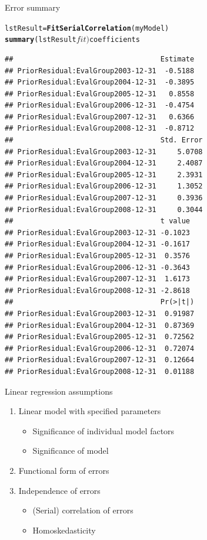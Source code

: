 \documentclass[xcolor=dvipsnames]{beamer}\usepackage{graphicx, color}
\makeatletter
\newcommand{\hlfunctioncall}[1]{\textcolor[rgb]{0.501960784313725,0,0.329411764705882}{\textbf{#1}}}%
\newenvironment{kframe}{%
 \def\at@end@of@kframe{}%
 \ifinner\ifhmode%
  \def\at@end@of@kframe{\end{minipage}}%
  \begin{minipage}{\columnwidth}%
 \fi\fi%
 \def\FrameCommand##1{\hskip\@totalleftmargin \hskip-\fboxsep
 \colorbox{shadecolor}{##1}\hskip-\fboxsep
     \hskip-\linewidth \hskip-\@totalleftmargin \hskip\columnwidth}%
 \MakeFramed {\advance\hsize-\width
   \@totalleftmargin\z@ \linewidth\hsize
   \@setminipage}}%
 {\par\unskip\endMakeFramed%
 \at@end@of@kframe}
\newenvironment{knitrout}{}{} %
\makeatother
\begin{document}
\begin{frame}[fragile]{Error summary}
\begin{knitrout}\tiny
{}\color{fgcolor}\begin{kframe}
\begin{alltt}
lstResult = \hlfunctioncall{FitSerialCorrelation}(myModel)
\hlfunctioncall{summary}(lstResult$fit)$coefficients
\end{alltt}
\begin{verbatim}
##                                   Estimate
## PriorResidual:EvalGroup2003-12-31  -0.5188
## PriorResidual:EvalGroup2004-12-31  -0.3895
## PriorResidual:EvalGroup2005-12-31   0.8558
## PriorResidual:EvalGroup2006-12-31  -0.4754
## PriorResidual:EvalGroup2007-12-31   0.6366
## PriorResidual:EvalGroup2008-12-31  -0.8712
##                                   Std. Error
## PriorResidual:EvalGroup2003-12-31     5.0708
## PriorResidual:EvalGroup2004-12-31     2.4087
## PriorResidual:EvalGroup2005-12-31     2.3931
## PriorResidual:EvalGroup2006-12-31     1.3052
## PriorResidual:EvalGroup2007-12-31     0.3936
## PriorResidual:EvalGroup2008-12-31     0.3044
##                                   t value
## PriorResidual:EvalGroup2003-12-31 -0.1023
## PriorResidual:EvalGroup2004-12-31 -0.1617
## PriorResidual:EvalGroup2005-12-31  0.3576
## PriorResidual:EvalGroup2006-12-31 -0.3643
## PriorResidual:EvalGroup2007-12-31  1.6173
## PriorResidual:EvalGroup2008-12-31 -2.8618
##                                   Pr(>|t|)
## PriorResidual:EvalGroup2003-12-31  0.91987
## PriorResidual:EvalGroup2004-12-31  0.87369
## PriorResidual:EvalGroup2005-12-31  0.72562
## PriorResidual:EvalGroup2006-12-31  0.72074
## PriorResidual:EvalGroup2007-12-31  0.12664
## PriorResidual:EvalGroup2008-12-31  0.01188
\end{verbatim}
\end{kframe}
\end{knitrout}

\end{frame}

\begin{frame}[fragile]{Linear regression assumptions}
  \begin{enumerate}
    \item Linear model with specified parameters
      \begin{itemize}
        \item Significance of individual model factors
        \item Significance of model
      \end{itemize}
    \item Functional form of errors
    \item Independence of errors
      \begin{itemize}
        \item (Serial) correlation of errors
        \item \color{blue} Homoskedasticity
      \end{itemize}
  \end{enumerate}
\end{frame}
\end{document}
